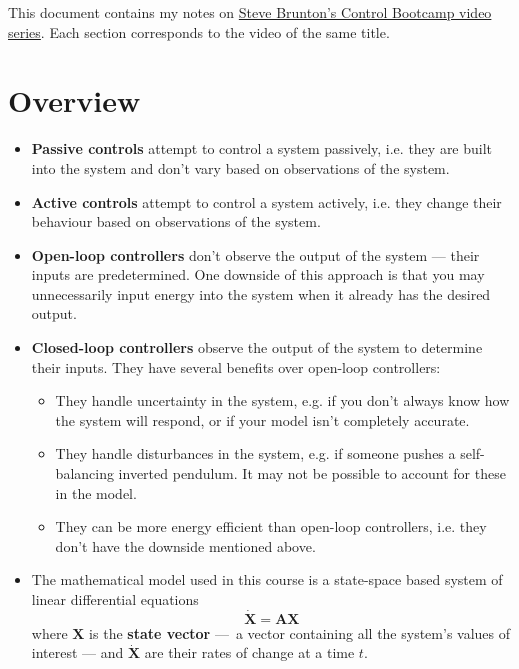 \documentclass{article}
\renewcommand{\vec}[1]{\boldsymbol{\mathbf{#1}}}
\newcommand{\dvec}[1]{\dot{\vec{#1}}}
\begin{document}
This document contains my notes on \href{https://www.youtube.com/playlist?list=PLMrJAkhIeNNR20Mz-VpzgfQs5zrYi085m}{Steve Brunton's Control Bootcamp video series}. Each section corresponds to the video of the same title.

\tableofcontents

\section{Overview}

\begin{itemize}
  \item \textbf{Passive controls} attempt to control a system passively, i.e. they are built into the system and don't vary based on observations of the system.

  \item \textbf{Active controls} attempt to control a system actively, i.e. they change their behaviour based on observations of the system.

  \item \textbf{Open-loop controllers} don't observe the output of the system — their inputs are predetermined. One downside of this approach is that you may unnecessarily input energy into the system when it already has the desired output.

  \item \textbf{Closed-loop controllers} observe the output of the system to determine their inputs. They have several benefits over open-loop controllers:

        \begin{itemize}
          \item They handle uncertainty in the system, e.g. if you don't always know how the system will respond, or if your model isn't completely accurate.

          \item They handle disturbances in the system, e.g. if someone pushes a self-balancing inverted pendulum. It may not be possible to account for these in the model.

          \item They can be more energy efficient than open-loop controllers, i.e. they don't have the downside mentioned above.
        \end{itemize}

  \item The mathematical model used in this course is a state-space based system of linear differential equations \[\dvec{X} = \vec{A} \vec{X}\] where $\vec{X}$ is the \textbf{state vector} — a vector containing all the system's values of interest — and $\dvec{X}$ are their rates of change at a time $t$.


\end{itemize}
\end{document}
